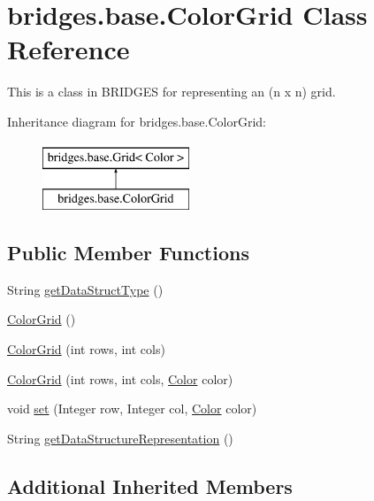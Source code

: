 \hypertarget{classbridges_1_1base_1_1_color_grid}{}\section{bridges.\+base.\+Color\+Grid Class Reference}
\label{classbridges_1_1base_1_1_color_grid}


This is a class in B\+R\+I\+D\+G\+E\+S for representing an (n x n) grid.  


Inheritance diagram for bridges.\+base.\+Color\+Grid\+:\begin{figure}[H]
\begin{center}
\leavevmode
\includegraphics[height=2.000000cm]{classbridges_1_1base_1_1_color_grid}
\end{center}
\end{figure}
\subsection*{Public Member Functions}
\begin{DoxyCompactItemize}
\item 
String \hyperlink{classbridges_1_1base_1_1_color_grid_a53a1f3f105f8545796f98e5fac559b5b}{get\+Data\+Struct\+Type} ()
\item 
\hyperlink{classbridges_1_1base_1_1_color_grid_af434a5a3dcbaf86e51ac6f9e1c1d7e5f}{Color\+Grid} ()
\item 
\hyperlink{classbridges_1_1base_1_1_color_grid_aafb4157a4c8129f30c1f989fcdfda544}{Color\+Grid} (int rows, int cols)
\item 
\hyperlink{classbridges_1_1base_1_1_color_grid_aef40242c93b66ab851e6afa64cada0b5}{Color\+Grid} (int rows, int cols, \hyperlink{classbridges_1_1base_1_1_color}{Color} color)
\item 
void \hyperlink{classbridges_1_1base_1_1_color_grid_a93b29af9bb21b2bf6e52bc3fda9ff34a}{set} (Integer row, Integer col, \hyperlink{classbridges_1_1base_1_1_color}{Color} color)
\item 
String \hyperlink{classbridges_1_1base_1_1_color_grid_a81ca0995d17b6cb31122b718dfa57286}{get\+Data\+Structure\+Representation} ()
\end{DoxyCompactItemize}
\subsection*{Additional Inherited Members}


